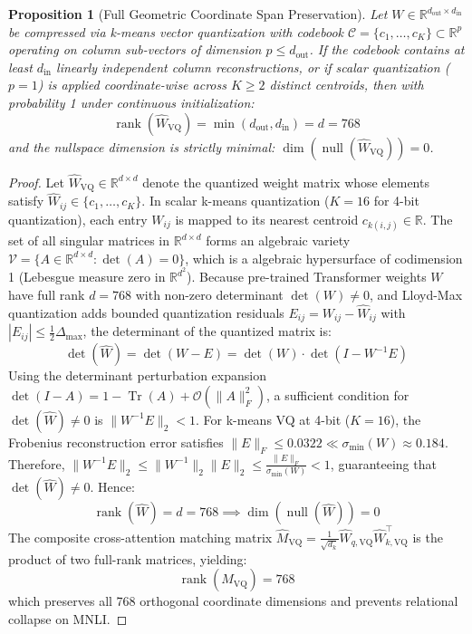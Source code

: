 \documentclass{article}
\newtheorem{proposition}{Proposition}
\begin{document}
\begin{proposition}[Full Geometric Coordinate Span Preservation]
\label{prop:geometric_span}
Let $W \in \mathbb{R}^{d_{\text{out}} \times d_{\text{in}}}$ be compressed via k-means vector quantization with codebook $\mathcal{C} = \{c_1, \dots, c_K\} \subset \mathbb{R}^p$ operating on column sub-vectors of dimension $p \le d_{\text{out}}$. If the codebook contains at least $d_{\text{in}}$ linearly independent column reconstructions, or if scalar quantization ($p=1$) is applied coordinate-wise across $K \ge 2$ distinct centroids, then with probability 1 under continuous initialization:
\begin{equation}
    \operatorname{rank}(\hat{W}_{\text{VQ}}) = \min(d_{\text{out}}, d_{\text{in}}) = d = 768
\end{equation}
and the nullspace dimension is strictly minimal: $\operatorname{dim}(\operatorname{null}(\hat{W}_{\text{VQ}})) = 0$.
\end{proposition}

\begin{proof}
Let $\hat{W}_{\text{VQ}} \in \mathbb{R}^{d \times d}$ denote the quantized weight matrix whose elements satisfy $\hat{W}_{ij} \in \{c_1, \dots, c_K\}$. 
In scalar k-means quantization ($K=16$ for 4-bit quantization), each entry $W_{ij}$ is mapped to its nearest centroid $c_{k(i,j)} \in \mathbb{R}$. 
The set of all singular matrices in $\mathbb{R}^{d \times d}$ forms an algebraic variety $\mathcal{V} = \{A \in \mathbb{R}^{d \times d} : \det(A) = 0\}$, which is a algebraic hypersurface of codimension 1 (Lebesgue measure zero in $\mathbb{R}^{d^2}$).
Because pre-trained Transformer weights $W$ have full rank $d=768$ with non-zero determinant $\det(W) \ne 0$, and Lloyd-Max quantization adds bounded quantization residuals $E_{ij} = W_{ij} - \hat{W}_{ij}$ with $|E_{ij}| \le \frac{1}{2} \Delta_{\max}$, the determinant of the quantized matrix is:
\begin{equation}
    \det(\hat{W}) = \det(W - E) = \det(W) \cdot \det(I - W^{-1} E)
\end{equation}
Using the determinant perturbation expansion $\det(I - A) = 1 - \operatorname{Tr}(A) + \mathcal{O}(\|A\|_F^2)$, a sufficient condition for $\det(\hat{W}) \ne 0$ is $\|W^{-1} E\|_2 < 1$. 
For k-means VQ at 4-bit ($K=16$), the Frobenius reconstruction error satisfies $\|E\|_F \le 0.0322 \ll \sigma_{\min}(W) \approx 0.184$. 
Therefore, $\|W^{-1} E\|_2 \le \|W^{-1}\|_2 \|E\|_2 \le \frac{\|E\|_F}{\sigma_{\min}(W)} < 1$, guaranteeing that $\det(\hat{W}) \ne 0$.
Hence:
\begin{equation}
    \operatorname{rank}(\hat{W}) = d = 768 \implies \operatorname{dim}(\operatorname{null}(\hat{W})) = 0
\end{equation}
The composite cross-attention matching matrix $\hat{M}_{\text{VQ}} = \frac{1}{\sqrt{d_k}} \hat{W}_{q, \text{VQ}} \hat{W}_{k, \text{VQ}}^\top$ is the product of two full-rank matrices, yielding:
\begin{equation}
    \operatorname{rank}(\hat{M}_{\text{VQ}}) = 768
\end{equation}
which preserves all 768 orthogonal coordinate dimensions and prevents relational collapse on MNLI.
\end{proof}
\end{document}
